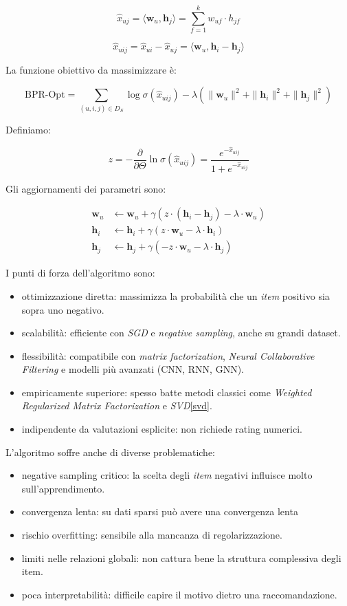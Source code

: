 \[
\hat{x}_{uj} = \langle \mathbf{w}_u, \mathbf{h}_j \rangle = \sum_{f=1}^{k} w_{uf} \cdot h_{jf}
\]

\[
\hat{x}_{uij} = \hat{x}_{ui} - \hat{x}_{uj} = \langle \mathbf{w}_u, \mathbf{h}_i - \mathbf{h}_j \rangle
\]


La funzione obiettivo da massimizzare è:

\[
\text{BPR-Opt} = \sum_{(u,i,j) \in D_S} \log \sigma(\hat{x}_{uij}) 
- \lambda \left( \|\mathbf{w}_u\|^2 + \|\mathbf{h}_i\|^2 + \|\mathbf{h}_j\|^2 \right)
\]

Definiamo:

\[
z = -\frac{\partial}{\partial \Theta} \ln \sigma(\hat{x}_{uij}) = \frac{e^{-\hat{x}_{uij}}}{1 + e^{-\hat{x}_{uij}}}
\]

Gli aggiornamenti dei parametri sono:

\begin{align*}
\mathbf{w}_u &\leftarrow \mathbf{w}_u + \gamma \left( z \cdot (\mathbf{h}_i - \mathbf{h}_j) - \lambda \cdot \mathbf{w}_u \right) \\
\mathbf{h}_i &\leftarrow \mathbf{h}_i + \gamma \left( z \cdot \mathbf{w}_u - \lambda \cdot \mathbf{h}_i \right) \\
\mathbf{h}_j &\leftarrow \mathbf{h}_j + \gamma \left( -z \cdot \mathbf{w}_u - \lambda \cdot \mathbf{h}_j \right)
\end{align*}

I punti di forza dell'algoritmo sono:

\begin{itemize}
    \item ottimizzazione diretta: massimizza la probabilità che un \textit{item} positivo sia sopra uno negativo.
    \item scalabilità: efficiente con \textit{SGD} e \textit{negative sampling}, anche su grandi dataset.
    \item flessibilità: compatibile con \textit{matrix factorization}, \textit{Neural Collaborative Filtering} e modelli più avanzati (CNN, RNN, GNN).
    \item empiricamente superiore: spesso batte metodi classici come \textit{Weighted Regularized Matrix Factorization} e \textit{SVD}\ref{svd}.
    \item indipendente da valutazioni esplicite: non richiede rating numerici.
\end{itemize}

L'algoritmo soffre anche di diverse problematiche:

\begin{itemize}
    \item negative sampling critico: la scelta degli \textit{item} negativi influisce molto sull'apprendimento.
    \item convergenza lenta: su dati sparsi può avere una convergenza lenta
    \item rischio overfitting: sensibile alla mancanza di regolarizzazione.
    \item limiti nelle relazioni globali: non cattura bene la struttura complessiva degli item.
    \item poca interpretabilità: difficile capire il motivo dietro una raccomandazione.
\end{itemize}

